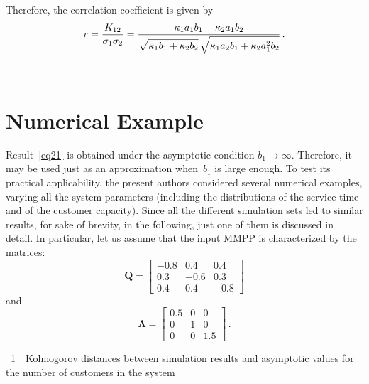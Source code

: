 \begin{multicols}{2}
Therefore, the correlation coefficient is given by
$$
r=\displaystyle\frac{\displaystyle K_{12}\mathstrut}{\displaystyle \sigma_1\sigma_2\mathstrut}=
\displaystyle\frac{\displaystyle \kappa_1a_1b_1+\kappa_2a_1b_2\mathstrut}{\displaystyle \sqrt{\kappa_1b_1+\kappa_2b_2}\,
\sqrt{\kappa_1a_2b_1+\kappa_2a_1^2b_2}\mathstrut}\,.
$$

\begin{figure*}[b] %
\vspace*{1pt}
 \begin{center}
 \mbox{%
 \epsfxsize=163.767mm 
 }
  \end{center}
\vspace*{-11pt}
\label{fig:fig3}
\end{figure*}

\section{Numerical Example}

\noindent
Result~\eqref{eq21} is obtained under the asymptotic condition $b_1\to\infty$. 
Therefore, it may be used just as an approximation when~$b_1$ is large enough. 
To test its practical applicability, the present authors
 considered several numerical examples, 
varying all the system parameters (including the distributions of the service 
time and of the customer capacity). Since all the different simulation sets led 
to similar results, for sake of brevity, in the following, 
just one of them is discussed in detail. In particular, let us
assume that the input MMPP is characterized by the matrices:
$$
\mathbf{Q}=\left[
\begin{array}{rrr}
-0.8 & 0.4 & 0.4\\
0.3 & -0.6 & 0.3\\
0.4 & 0.4 & -0.8
\end{array}\right]
$$
and
$$
\mathbf{\Lambda}=\left[
\begin{array}{ccc}
0.5 & 0 & 0\\
0 & 1 & 0\\
0 & 0 & 1.5
\end{array}\right] \,.
$$

\begin{center}
\begin{minipage}[t]{34mm}
{{\tablename~1}\ \ \small{Kolmogorov distances between simulation results and asymptotic 
values for the number of customers in the system}}


\end{minipage}
\end{center}
\end{multicols}
